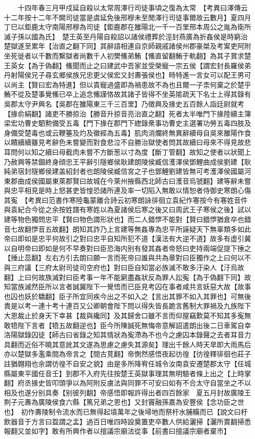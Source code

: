 　　十四年春三月甲戍延自殺以太常周澤行司徒事頃之復為太常　【考異曰澤傳云十二年按十二年不闕司徒當是虞延免後邢穆未至閒澤行司徒事爾故云數月】夏四月丁巳以鉅鹿太守南陽邢穆為司徒【鉅鹿郡在雒陽北一千一百里邢本周公之胤為衛所滅子孫以國為氏】　楚王英至丹陽自殺詔以諸侯禮葬於涇封燕廣為折姦侯是時窮治楚獄遂至累年【治直之翻下同】其辭語相連自京師親戚諸侯州郡豪桀及考案吏阿附坐死徙者以千數而繫獄者尚數千人初樊鯈弟鮪【鯈直留翻鮪于軌翻】為其子賞求楚王英女【為于偽翻】鯈聞而止之曰建武中吾家並受榮寵一宗五侯【謂宏封長羅侯弟丹射陽侯兄子尋玄鄉侯族兄忠更父侯宏又封夀張侯也】時特進一言女可以配王男可以尚主【賢曰宏為特進】但以貴寵過盛即為禍患故不為也且爾一子柰何棄之於楚乎鮪不從及楚事覺鯈已卒上追念鯈謹恪故其諸子皆得不坐英隂疏天下名士上得其錄有吳郡太守尹興名【吳郡在雒陽東三千三百里】乃徵興及掾史五百餘人詣廷尉就考【掾俞絹翻】諸吏不勝掠治【勝音升掠音亮治直之翻】死者太半唯門下掾陸續主簿梁宏功曹史駟勲備受五毒【門下掾在郡門下緫錄衆事功曹史主選署功勞五毒四肢及身備受楚毒也或云鞭箠及灼及徽經為五毒】肌肉消爛終無異辭續母自吳來雒陽作食以饋續續雖見考辭色未嘗變而對食悲泣不自勝治獄使者問其故續曰母來不得見故悲耳問何以知之續曰母截肉未嘗不方斷葱以寸為度【斷丁管翻】故知之使者以狀聞上乃赦興等禁錮終身顔忠王平辭引隧鄉侯耿建朗陵侯臧信濩澤侯鄧鯉曲成侯劉建【耿純弟宿封隧鄉侯建盖紹封者也朗陵侯臧信宮之子也鄧鯉劉建皆無可考濩澤侯國屬河東郡曲成侯國屬東萊郡賢曰故城在今萊州掖縣西北師古曰濩音烏虢翻】建等辭未嘗與忠平相見是時上怒甚吏皆惶恐諸所連及率一切䧟入無敢以情恕者侍御史寒朗心傷其寃　【考異曰范書作寒陸龜蒙離合詩云初寒朗詠徘徊立袁紀作寋按今有寋姓音件與袁紀合今從之余按姓譜有寒姓以為夏諸侯后寒之後又曰周武王子寒侯之後】試以建等物色獨問忠平【賢曰物色謂形狀也】而二人錯㦍不能對【賢曰錯㦍猶倉卒也錯音七故翻㦍音五故翻】朗知其詐乃上言建等無姦專為忠平所誣疑天下無辜類多如此帝曰即如是忠平何故引之對曰忠平自知所犯不道【漢法有大逆不道】故多有虚引冀以自明帝曰即如是何不早奏對曰臣恐海内别有發其姦者帝怒曰吏持兩端促提下捶之【捶止蕊翻】左右方引去朗曰願一言而死帝曰誰與共為章對曰臣獨作之上曰何以不與三府議【三府太尉司徒司空府也】對曰臣自知當必族滅不敢多汙染人【汙烏故翻】上曰何故族滅對曰臣考事一年不能窮盡姦狀反為罪人訟寃【為于偽翻下同】故知當族滅然臣所以言者誠冀陛下一覺悟而已臣見考囚在事者咸共言妖惡大故【故事也囚也妖於驕翻】臣子所宜同疾今出之不如入之【言出其罪不如入其罪也】可無後責是以考一連十考十連百又公卿朝會陛下問以得失皆長跪言舊制大罪禍及九族陛下大恩裁止於身天下幸甚【裁與纔同】及其歸舍口雖不言而仰屋竊歎莫不知其多寃無敢牾陛下言者【牾五故翻逆也】臣今所陳誠死無悔帝意解詔遣朗出後二日車駕自幸洛陽獄錄囚徒【師古曰省錄之知其情狀為寃滯為不也今之慮囚本錄聲之去者耳音力具翻而近俗不曉其意訛其文遂為思慮之慮失其源矣】理出千餘人時天旱即大雨馬后亦以楚獄多濫乘間為帝言之【間古莧翻】帝惻然感悟夜起彷徨【彷徨釋徘徊也莊子註猶翺翔也余謂彷徨不自安之貌】由是多所降宥任城令汝南袁安遷楚郡太守【任城縣屬東平國任音壬】到郡不入府先往按楚王英獄事理其無明驗者條上出之【上時掌翻】府丞掾史皆叩頭爭以為阿附反虜法與同罪不可安曰如有不合太守自當坐之不以相及也遂分别具奏【别彼列翻】帝感悟即報許得出者四百餘家　夏五月封故廣陵王荆子元夀為廣陵侯食六縣【篤兄弟之恩也】又封竇融孫嘉為安豐侯【念功臣之世也】　初作夀陵制令流水而已無得起墳萬年之後埽地而祭杅水脯糒而已【說文曰杅飲器音于方言曰盌謂之盂】過百日唯四時設奠置吏卒數人供給灑掃【灑所賣翻掃悉報翻又並如字】敢有所興作者以擅議宗廟法從事【前書曰擅議宗廟者棄市】

